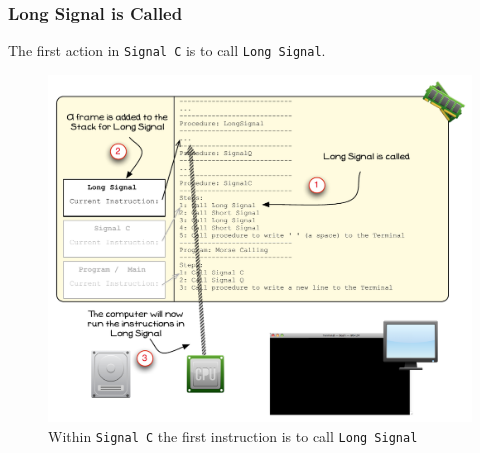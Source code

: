 
\clearpage
\subsubsection{Long Signal is Called} %
\label{ssub:long_signal_is_called}

The first action in \texttt{Signal C} is to call \texttt{Long Signal}.

\begin{figure}[htbp]
   \centering
   \includegraphics[width=\textwidth]{./topics/procedure-decl/images/ProcExe3} 
   \caption{Within \texttt{Signal C} the first instruction is to call \texttt{Long Signal}}
   \label{fig:procedure-decl-visualise-morsecalling-3}
\end{figure}

